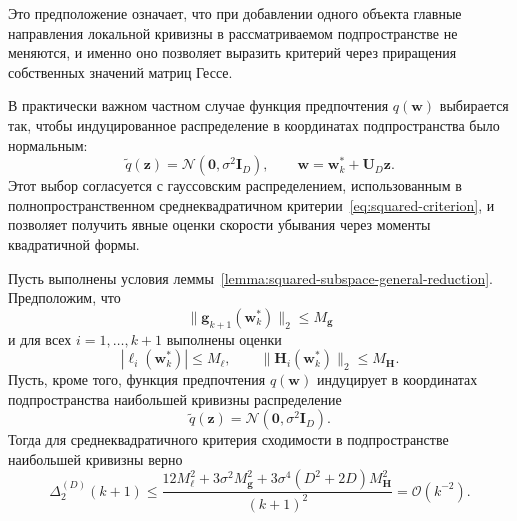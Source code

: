 Это предположение означает, что при добавлении одного объекта главные направления локальной кривизны в рассматриваемом подпространстве не меняются, и именно оно позволяет выразить критерий через приращения собственных значений матриц Гессе.

\begin{remark}
    В практически важном частном случае функция предпочтения $q(\mathbf w)$ выбирается так, чтобы индуцированное распределение в координатах подпространства было нормальным:
    \begin{equation}
        \tilde{q}(\mathbf z) = \mathcal N(\mathbf 0, \sigma^2 \mathbf I_D),
        \qquad
        \mathbf w = \mathbf w_k^* + \mathbf U_D \mathbf z.
    \end{equation}
    Этот выбор согласуется с гауссовским распределением, использованным в полнопространственном среднеквадратичном критерии~\eqref{eq:squared-criterion}, и позволяет получить явные оценки скорости убывания через моменты квадратичной формы.
\end{remark}

\begin{theorem}
    \label{thm:squared-subspace-general}
    Пусть выполнены условия леммы~\ref{lemma:squared-subspace-general-reduction}. Предположим, что
    \begin{equation}
        \|\mathbf g_{k+1}(\mathbf w_k^*)\|_2 \leqslant M_{\mathbf g}
    \end{equation}
    и для всех $i=1, \ldots, k+1$ выполнены оценки
    \begin{equation}
        |\ell_i(\mathbf w_k^*)| \leqslant M_\ell,
        \qquad
        \|\mathbf H_i(\mathbf w_k^*)\|_2 \leqslant M_{\mathbf H}.
    \end{equation}
    Пусть, кроме того, функция предпочтения $q(\mathbf w)$ индуцирует в координатах подпространства наибольшей кривизны распределение
    \begin{equation}
        \tilde q(\mathbf z)=\mathcal N(\mathbf 0,\sigma^2 \mathbf I_D).
    \end{equation}
    Тогда для среднеквадратичного критерия сходимости в подпространстве наибольшей кривизны верно
    \begin{equation}
        \label{eq:squared-subspace-general-theorem}
        \Delta_2^{(D)}(k+1)
        \leqslant
        \frac{
            12M_\ell^2
            +
            3\sigma^2 M_{\mathbf g}^2
            +
            3\sigma^4(D^2+2D)M_{\mathbf H}^2
        }{(k+1)^2}
        = \mathcal{O}(k^{-2}).
    \end{equation}
\end{theorem}

